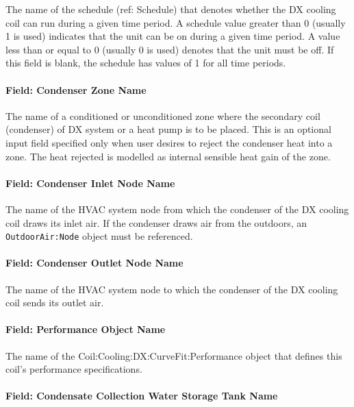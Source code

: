 The name of the schedule (ref: Schedule) that denotes whether the DX cooling coil can run during a given time period. A schedule value greater than 0 (usually 1 is used) indicates that the unit can be on during a given time period. A value less than or equal to 0 (usually 0 is used) denotes that the unit must be off. If this field is blank, the schedule has values of 1 for all time periods.

\paragraph{Field: Condenser Zone Name}\label{field-condenser-zone-name-6-001}

The name of a conditioned or unconditioned zone where the secondary coil (condenser) of DX system or a heat pump is to be placed. This is an optional input field specified only when user desires to reject the condenser heat into a zone. The heat rejected is modelled as internal sensible heat gain of the zone.

\paragraph{Field: Condenser Inlet Node Name}\label{field-condenser-inlet-node-name-6-001}

The name of the HVAC system node from which the condenser of the DX cooling coil draws its inlet air. If the condenser draws air from the outdoors, an \texttt{OutdoorAir:Node} object must be referenced.

\paragraph{Field: Condenser Outlet Node Name}\label{field-condenser-outlet-node-name-6-001}

The name of the HVAC system node to which the condenser of the DX cooling coil sends its outlet air.

\paragraph{Field: Performance Object Name}\label{field-performance-object-name-6-001}

The name of the Coil:Cooling:DX:CurveFit:Performance object that defines this coil's performance specifications.

\paragraph{Field: Condensate Collection Water Storage Tank Name}

